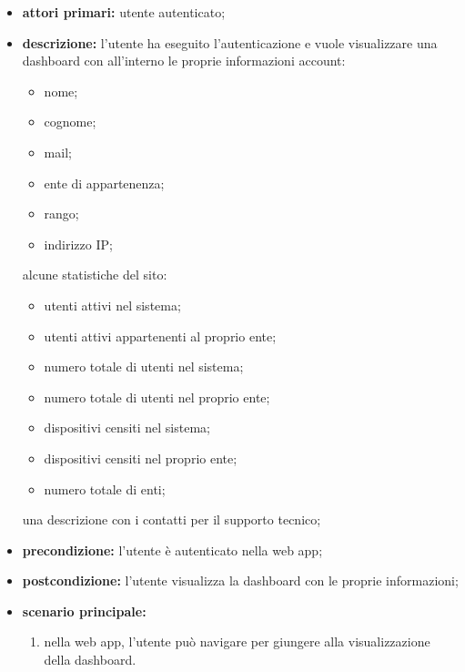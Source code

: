 		\begin{itemize}
			\item \textbf{attori primari:} utente autenticato;
			\item \textbf{descrizione:} l'utente ha eseguito l'autenticazione e vuole visualizzare una dashboard con all'interno le proprie informazioni account:
			\begin{itemize}
			 	\item nome;
			 	\item cognome;
			 	\item mail;
			 	\item ente di appartenenza;
			 	\item rango;
			 	\item indirizzo IP;
			 \end{itemize}
			 alcune statistiche del sito:
			 \begin{itemize}
			  	\item utenti attivi nel sistema;
			  	\item utenti attivi appartenenti al proprio ente;
			   	\item numero totale di utenti nel sistema;
			   	\item numero totale di utenti nel proprio ente;
			   	\item dispositivi censiti nel sistema;
			   	\item dispositivi censiti nel proprio ente;
			   	\item numero totale di enti;
			 \end{itemize}
			 una descrizione con i contatti per il supporto tecnico;
			\item \textbf{precondizione:} l'utente è autenticato nella web app;
			\item \textbf{postcondizione:} l'utente visualizza la dashboard con le proprie informazioni;
			\item \textbf{scenario principale:}
			\begin{enumerate}
				\item nella web app, l'utente può navigare per giungere alla visualizzazione della dashboard.
			\end{enumerate}
		\end{itemize}


